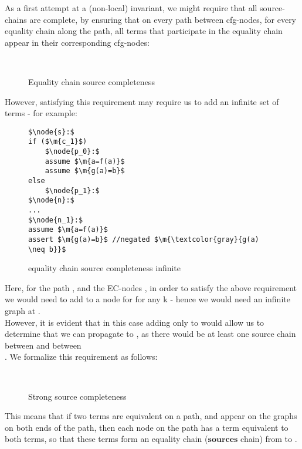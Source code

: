 As a first attempt at a (non-local) invariant, we might require that all source-chains are complete, by ensuring that on every path between cfg-nodes, for every equality chain along the path, all terms that participate in the equality chain appear in their corresponding cfg-nodes:
\begin{figure}[H]
\\
\caption{Equality chain source completeness}
\label{equality_chain_source_completeness}
\end{figure}
However, satisfying this requirement may require us to add an infinite set of terms - for example:
\begin{figure}[H]
\begin{lstlisting}
$\node{s}:$
if ($\m{c_1}$)
	$\node{p_0}:$
	assume $\m{a=f(a)}$
	assume $\m{g(a)=b}$
else
	$\node{p_1}:$
$\node{n}:$
...
$\node{n_1}:$
assume $\m{a=f(a)}$
assert $\m{g(a)=b}$ //negated $\m{\textcolor{gray}{g(a) \neq b}}$
\end{lstlisting}
\caption{equality chain source completeness infinite}
\label{snippet3.16cx}
\end{figure}
Here, for the path , and the EC-nodes , in order to satisfy the above requirement 
we would need to add to  a node for  for any k - hence we would need an infinite graph at .\\
However, it is evident that in this case adding only  to  would allow us to determine that we can propagate  to , as there would be at least one source chain between 
 and between \\
.
We formalize this requirement as follows:
\begin{figure}[H]
\\
\caption{Strong source completeness}
\label{strong_source_completeness}
\end{figure}
This means that if two terms are equivalent on a path, and appear on the graphs on both ends of the path, then each node on the path has a term equivalent to both terms, so that these terms form an equality chain ($\mathbf{sources}$ chain) from  to .\\
